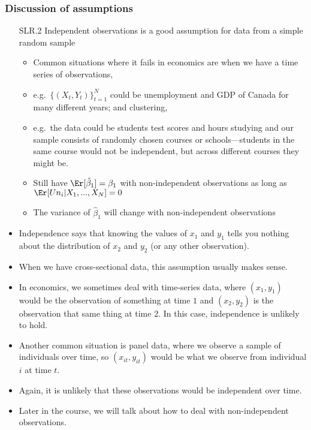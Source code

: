 \begin{frame}[allowframebreaks]
  \frametitle{Discussion of assumptions}
  \begin{itemize}
  \item[SLR.2] Independent observations is a good assumption for data
    from a simple random sample
    \begin{itemize}
    \item Common situations where it fails in
      economics are when we have a time series of observations,
      \item e.g.\ $\{(X_t,Y_t)\}_{t=1}^N$ could be unemployment and GDP of
      Canada for many different years; and clustering, 
      \item e.g.\ the data
      could be students test scores and hours studying and our sample
      consists of randomly chosen courses or schools---students in the
      same course would not be independent, but across different courses
      they might be.
    \item Still have $\Er[\hat{\beta}_1] = \beta_1$ with
      non-independent observations as long as $\Er[Un_i | X_1, ..., X_N] = 0$
    \item The variance of $\hat{\beta}_1$ will change with
      non-independent observations
    \end{itemize}
 
\item Independence says that knowing the values of $x_1$ and $y_1$ tells you
nothing about the distribution of $x_2$ and $y_2$ (or any other
observation).
\item  When we have cross-sectional data, this assumption
usually makes sense. 
\item In economics, we sometimes deal with time-series
data, where $(x_1,y_1)$ would be the observation of something at time
$1$ and $(x_2,y_2)$ is the observation that same thing at time $2$. In
this case, independence is unlikely to hold. 
\item Another common situation
is panel data, where we observe a sample of individuals over time, so
$(x_{it}, y_{it})$ would be what we observe from individual $i$ at
time $t$. 
\item Again, it is unlikely that these observations would be
independent over time.  
\item Later in the course, we will talk about how to
deal with non-independent observations.
\end{itemize}
\end{frame}

